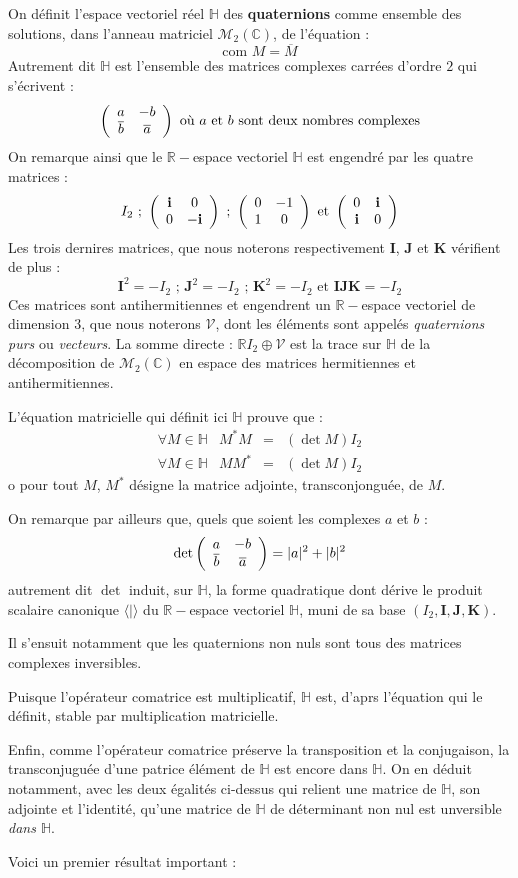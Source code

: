 On d\'efinit l'espace vectoriel r\'eel $\mathbb{H}$ des \textbf{quaternions} comme ensemble des solutions, %
dans l'anneau matriciel $\mathcal{M}_2(\mathbb{C})$, de l'\'equation :
\[\text{com }M=\overline{M}\]
Autrement dit $\mathbb{H}$ est l'ensemble des matrices complexes carr\'ees d'ordre $2$ qui s'\'ecrivent :
\[\left(\begin{array}{cc}a&-b\\ \overline{b}&\overline{a}\end{array}\right)\text{ o\`u $a$ et $b$ sont deux nombres complexes}\]
On remarque ainsi que le $\mathbb{R}-$espace vectoriel $\mathbb{H}$ est engendr\'e par les quatre matrices :
\[I_2\text{ ; }\left(\begin{array}{cc}\mathbf{i}&0\\0&-\mathbf{i}\end{array}\right)\text{ ; }\left(\begin{array}{cc}0&-1\\1&0\end{array}\right)\text{ et }\left(\begin{array}{cc}0&\mathbf{i}\\\mathbf{i}&0\end{array}\right)\]
Les trois dernires matrices, que nous noterons respectivement $\mathbf{I}$, $\mathbf{J}$ et $\mathbf{K}$ v\'erifient de plus :
\[\mathbf{I}^2=-I_2\text{ ; }\mathbf{J}^2=-I_2\text{ ; }\mathbf{K}^2=-I_2\text{ et }\mathbf{IJK}=-I_2\]
Ces matrices sont antihermitiennes et engendrent un $\mathbb{R}-$espace vectoriel de dimension $3$, %
que nous noterons $\mathcal{V}$, dont les \'el\'ements sont appel\'es \emph{quaternions purs} ou \emph{vecteurs}. %
La somme directe : $\mathbb{R}I_2\oplus\mathcal{V}$ est la trace sur $\mathbb{H}$ de la d\'ecomposition de $\mathcal{M}_2(\mathbb{C})$ %
en espace des matrices hermitiennes et antihermitiennes.
\par
L'\'equation matricielle qui d\'efinit ici $\mathbb{H}$ prouve que :
\[
\begin{array}{lccr}
\forall M\in\mathbb{H}& M^{\ast}M&=&(\det M)I_2\\
\forall M\in\mathbb{H}& MM^{\ast}&=&(\det M)I_2
\end{array}
\]
o pour tout $M$, $M^{\ast}$ d\'esigne la matrice adjointe, transconjongu\'ee, de $M$.
\par
On remarque par ailleurs que, quels que soient les complexes $a$ et $b$ :
\[\det\left(\begin{array}{cc}a&-b\\\overline{b}&\overline{a}\end{array}\right)=|a|^2+|b|^2\]
autrement dit $\det$ induit, sur $\mathbb{H}$, la forme quadratique dont d\'erive le produit scalaire canonique $\langle | \rangle$ du $\mathbb{R}-$espace vectoriel $\mathbb{H}$, %
muni de sa base $(I_2,\mathbf{I},\mathbf{J},\mathbf{K})$.
\par
Il s'ensuit notamment que les quaternions non nuls sont tous des matrices complexes inversibles.
\par
Puisque l'op\'erateur \og{}comatrice\fg{} est multiplicatif, $\mathbb{H}$ est, d'aprs l'\'equation qui le d\'efinit, stable par multiplication matricielle.
\par
Enfin, comme l'op\'erateur \og{}comatrice\fg{} pr\'eserve la transposition et la conjugaison, %
la transconjugu\'ee d'une patrice \'el\'ement de $\mathbb{H}$ est encore dans $\mathbb{H}$. %
On en d\'eduit notamment, avec les deux \'egalit\'es ci-dessus qui relient une matrice de $\mathbb{H}$, son adjointe et l'identit\'e, %
qu'une matrice de $\mathbb{H}$ de d\'eterminant non nul est unversible \emph{dans $\mathbb{H}$}.
\par
Voici un premier r\'esultat important :

